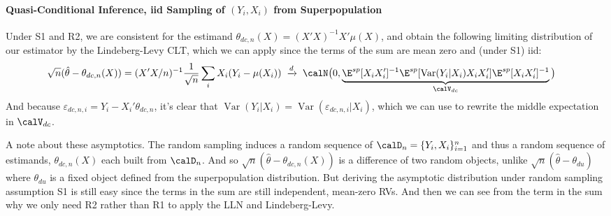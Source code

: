 \documentclass[12pt]{article}
\theoremstyle{plain}
\theoremstyle{definition}
\theoremstyle{remark}
\newcommand{\Var}{\operatorname{Var}}
\newcommand{\dto}{\xrightarrow{d}}
\begin{document}
\paragraph{Quasi-Conditional Inference, iid Sampling of $(Y_i,X_i)$ from Superpopulation}
Under S1 and R2, we are consistent for the estimand
$\theta_{dc,n}(X)=(X'X)^{-1}X'\mu(X)$,
and obtain the following limiting distribution of our estimator by
the Lindeberg-Levy CLT, which we can apply since the terms of the
sum are mean zero and (under S1) iid:
\begin{align*}
  \sqrt{n}(\hat{\theta}-\theta_{dc,n}(X))
  &=
  (X'X/n)^{-1}
  \frac{1}{\sqrt{n}}
  \sum_i
  X_i
    (Y_i-\mu(X_i))
  \; \dto\;
  \calN\big(
    0,
    \underbrace{%
    \E^{sp}[X_iX_i']^{-1}
    \E^{sp}[\Var(Y_i|X_i)X_iX_i']
    \E^{sp}[X_iX_i']^{-1}
    }_{\calV_{dc}}
  \big)
\end{align*}
And because $\varepsilon_{dc,n,i}=Y_i-X_i'\theta_{dc,n}$, it's clear
that $\Var(Y_i|X_i)=\Var(\varepsilon_{dc,n,i}|X_i)$, which we can use to
rewrite the middle expectation in $\calV_{dc}$.

A note about these asymptotics.
The random sampling induces a random sequence of
$\calD_n=\{Y_i,X_i\}_{i=1}^n$ and thus a random sequence of
estimands, $\theta_{dc,n}(X)$ each built from $\calD_n$.
And so $\sqrt{n}(\hat{\theta}-\theta_{dc,n}(X))$ is a difference of two
random objects, unlike $\sqrt{n}(\hat{\theta}-\theta_{du})$ where
$\theta_{du}$ is a fixed object defined from the superpopulation
distribution.
But deriving the asymptotic distribution under random sampling
assumption S1 is still easy since the terms in the sum are still
independent, mean-zero RVs.
And then we can see from the term in the sum why we only need R2
rather than R1 to apply the LLN and Lindeberg-Levy.
\end{document}
